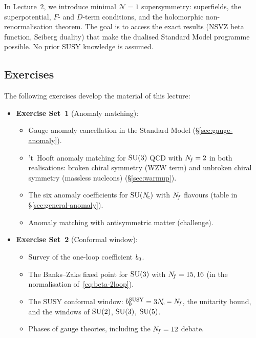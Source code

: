 \documentclass[11pt,a4paper]{article}
\begin{document}
In Lecture~2, we introduce minimal $\mathcal{N}=1$ supersymmetry:
superfields, the superpotential, $F$- and $D$-term conditions, and the
holomorphic non-renormalisation theorem.  The goal is to access the exact
results (NSVZ beta function, Seiberg duality) that make the dualised
Standard Model programme possible.  No prior SUSY knowledge is assumed.

\subsection{Exercises}

The following exercises develop the material of this lecture:
\begin{itemize}
  \item \textbf{Exercise Set~1} (Anomaly matching):
    \begin{itemize}
      \item[1] Gauge anomaly cancellation in the Standard Model
        (\S\ref{sec:gauge-anomaly}).
      \item[2] 't~Hooft anomaly matching for $\mathrm{SU}(3)$ QCD with $N_{\!f} = 2$
        in both realisations: broken chiral symmetry (WZW term) and
        unbroken chiral symmetry (massless nucleons) (\S\ref{sec:warmup}).
      \item[3] The six \UV{} anomaly coefficients for $\mathrm{SU}(N_{\!c})$ with
        $N_{\!f}$ flavours (table in \S\ref{sec:general-anomaly}).
      \item[4] Anomaly matching with antisymmetric matter (challenge).
    \end{itemize}
  \item \textbf{Exercise Set~2} (Conformal window):
    \begin{itemize}
      \item[1] Survey of the one-loop coefficient $b_0$.
      \item[2] The Banks--Zaks fixed point for $\mathrm{SU}(3)$ with
        $N_{\!f} = 15, 16$ (in the normalisation of~\eqref{eq:beta-2loop}).
      \item[3] The SUSY conformal window: $b_0^{\text{SUSY}} = 3N_{\!c} - N_{\!f}$,
        the unitarity bound, and the windows of $\mathrm{SU}(2)$, $\mathrm{SU}(3)$, $\mathrm{SU}(5)$.
      \item[4] Phases of gauge theories, including the $N_{\!f} = 12$ debate.
    \end{itemize}
\end{itemize}
\end{document}
